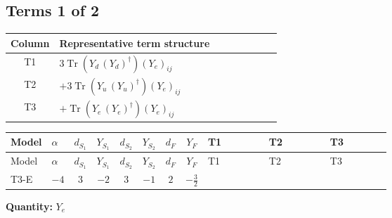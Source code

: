 \documentclass[8pt]{article}
\begin{document}
\begin{landscape}
\subsection*{Terms 1 of 2}
\begin{center}
\begin{tabular}{@{}c >{\raggedright\arraybackslash}p{0.82\linewidth}@{}}
\toprule
Column & Representative term structure \\
\midrule
T1 & \(\displaystyle 3 \operatorname{Tr}\!\left({Y_d}\,\left({Y_d}\right)^{\dagger}\right) \left({Y_e}\right)_{ij}\) \\
\midrule
T2 & \(\displaystyle +3 \operatorname{Tr}\!\left({Y_u}\,\left({Y_u}\right)^{\dagger}\right) \left({Y_e}\right)_{ij}\) \\
\midrule
T3 & \(\displaystyle +\operatorname{Tr}\!\left({Y_e}\,\left({Y_e}\right)^{\dagger}\right) \left({Y_e}\right)_{ij}\) \\
\midrule
\bottomrule
\end{tabular}
\end{center}
\smallskip
\tiny
\begin{longtable}{@{}llcccccc >{\raggedright\arraybackslash}p{0.21\linewidth} >{\raggedright\arraybackslash}p{0.21\linewidth} >{\raggedright\arraybackslash}p{0.21\linewidth}@{}}
\toprule
Model & $\alpha$ & $d_{S_1}$ & $Y_{S_1}$ & $d_{S_2}$ & $Y_{S_2}$ & $d_F$ & $Y_F$ & T1 & T2 & T3 \\
\midrule
\endfirsthead
\toprule
Model & $\alpha$ & $d_{S_1}$ & $Y_{S_1}$ & $d_{S_2}$ & $Y_{S_2}$ & $d_F$ & $Y_F$ & T1 & T2 & T3 \\
\midrule
\endhead
T3-E & $-4$ & $3$ & $-2$ & $3$ & $-1$ & $2$ & $-\frac{3}{2}$ & \scriptsize\adjustbox{max width=\linewidth}{$\begin{gathered} 3 \operatorname{Tr}\!\left({Y_d}\,\left({Y_d}\right)^{\dagger}\right) \left({Y_e}\right)_{ij}\end{gathered}$} & \scriptsize\adjustbox{max width=\linewidth}{$\begin{gathered} +3 \operatorname{Tr}\!\left({Y_u}\,\left({Y_u}\right)^{\dagger}\right) \left({Y_e}\right)_{ij}\end{gathered}$} & \scriptsize\adjustbox{max width=\linewidth}{$\begin{gathered} +\operatorname{Tr}\!\left({Y_e}\,\left({Y_e}\right)^{\dagger}\right) \left({Y_e}\right)_{ij}\end{gathered}$} \\
\midrule
\bottomrule
\end{longtable}
\clearpage
\noindent\textbf{Quantity: }$Y_e$\par\smallskip

\end{landscape}
\end{document}
